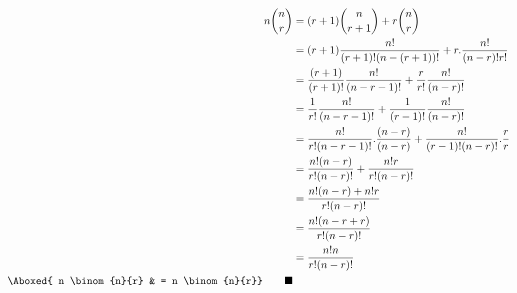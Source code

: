 
\begin{enunciation}
  \begin{displaymath}
  \end{displaymath}
\end{enunciation}

\begin{align*}
  n \binom{n}{r} & = (r+1)\binom{n}{r+1} + r\binom{n}{r} \\
  & = (r+1) \frac{n!}{(r+1)!(n-(r+1))!} + r.\frac{n!}{(n-r)!r!} \\
  & = \frac{(r+1)}{(r+1)!}\frac{n!}{(n-r-1)!} + \frac{r}{r!}\frac{n!}{(n-r)!} \\
  & = \frac{1}{r!}\frac{n!}{(n-r-1)!} + \frac{1}{(r-1)!}\frac{n!}{(n-r)!} \\
  & = \frac{n!}{r!(n-r-1)!}.\frac{(n-r)}{(n-r)} + \frac{n!}{(r-1)!(n-r)!}.\frac{r}{r} \\
  & = \frac{n!(n-r)}{r!(n-r)!} + \frac{n!r}{r!(n-r)!} \\
  & = \frac{n!(n-r) + n!r}{r!(n-r)!} \\
  & = \frac{n!(n-r+r)}{r!(n-r)!} \\
  & = \frac{n!n}{r!(n-r)!} \\
  \Aboxed{ n \binom{n}{r} & = n \binom{n}{r}} \qquad \blacksquare
\end{align*}

